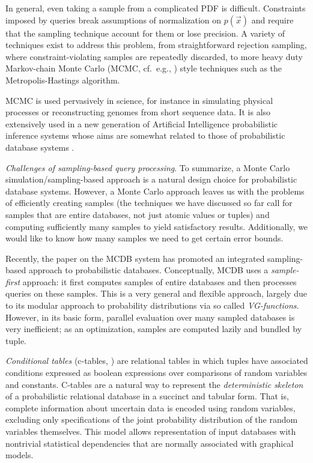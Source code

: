 In general, even taking a sample from a complicated PDF is difficult.  Constraints imposed by queries break assumptions of normalization on $p(\vec x)$ and require that the sampling technique account for them or lose precision.  A variety of techniques exist to address this problem, from straightforward rejection sampling, where constraint-violating samples are repeatedly discarded, to more heavy duty Markov-chain Monte Carlo (MCMC, cf.\ e.g., \cite{GRS1995}) style techniques such as the Metropolis-Hastings algorithm\cite{metropolis,GRS1995}. 

MCMC is used pervasively in science, for instance in simulating  physical processes  or reconstructing  genomes  from short sequence data.  It is also extensively used in a new generation of Artificial Intelligence probabilistic inference systems whose aims are somewhat related to those of probabilistic database systems \cite{RD2006, BLOG}.

{\em Challenges  of sampling-based query processing}\/.  To  summarize, a Monte Carlo simulation/sampling-based approach is  a  natural  design  choice  for  probabilistic  database  systems. However,  a  Monte Carlo  approach  leaves  us  with the  problems  of efficiently creating samples (the  techniques we have discussed so far call for samples that are  entire databases, not just atomic values or tuples) and computing sufficiently  many samples to yield satisfactory results.  Additionally, we would like to know how many samples we need to get certain error bounds.


Recently,  the paper  \cite{MCDB} on  the MCDB  system  has promoted an integrated  sampling-based  approach to  probabilistic databases.  Conceptually,  MCDB uses a {\em sample-first}\/ approach: it   first  computes  samples  of  entire databases and then processes queries  on these samples.  This is a very general and flexible approach, largely due to its modular approach to probability distributions via so called {\em VG-functions}\/.  However, in its basic form, parallel evaluation over many sampled databases is very inefficient; as an optimization, samples are computed lazily and bundled by tuple.  

{\em  Conditional tables}\/  (c-tables, \cite{IL1984})  are relational tables in which tuples have associated conditions expressed as boolean expressions over  comparisons of random variables  and constants. C-tables are a natural way to  represent  the  {\em  deterministic skeleton}\/  of a probabilistic relational  database in  a succinct  and tabular  form.  That  is, complete information  about uncertain data is encoded using random  variables, excluding only  specifications  of the  joint  probability  distribution of  the random  variables   themselves.   This  model   allows  representation of  input databases  with  nontrivial statistical  dependencies that are normally associated with graphical models. 

